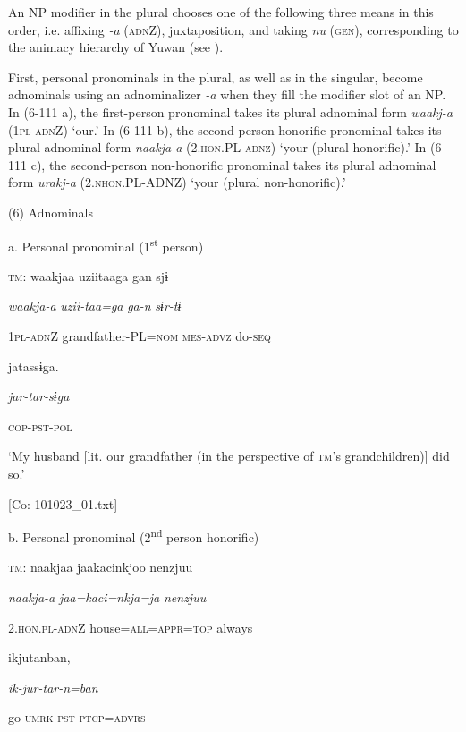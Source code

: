 An NP modifier in the plural chooses one of the following three means in this order, i.e. affixing \textit{{}-a} (\textsc{adn}Z), juxtaposition, and taking \textit{nu} (\textsc{gen}), corresponding to the animacy hierarchy of Yuwan (see ).

First, personal pronominals in the plural, as well as in the singular, become adnominals using an adnominalizer \textit{{}-a} when they fill the modifier slot of an NP. In (6-111 a), the first-person pronominal takes its plural adnominal form \textit{waakj-a} (1\textsc{pl}-\textsc{adn}Z) ‘our.’ In (6-111 b), the second-person honorific pronominal takes its plural adnominal form \textit{naakja-a} (2.\textsc{hon}.PL-\textsc{adnz}) ‘your (plural honorific).’ In (6-111 c), the second-person non-honorific pronominal takes its plural adnominal form \textit{urakj-a} (2.\textsc{nhon}.PL-ADNZ) ‘your (plural non-honorific).’

(6)  Adnominals

  a.  Personal pronominal (1\textsuperscript{st} person)

    \textsc{tm}:  waakjaa  uziitaaga  gan  sjɨ

      \textit{waakja-a}  \textit{uzii-taa=ga}  \textit{ga-n}  \textit{sɨr-tɨ}

      1\textsc{pl}-\textsc{adn}Z  grandfather-PL=\textsc{nom}  \textsc{mes}-\textsc{advz}  do-\textsc{seq}

      jatassɨga.

      \textit{jar-tar-sɨga}

      \textsc{cop}-\textsc{pst}-\textsc{pol}

      ‘My husband [lit. our grandfather (in the perspective of \textsc{tm}’s grandchildren)] did so.’

      [Co: 101023\_01.txt]

  b.  Personal pronominal (2\textsuperscript{nd} person honorific)

    \textsc{tm}:  naakjaa  jaakacinkjoo  {\textbar}nenzjuu{\textbar}

      \textit{naakja-a}  \textit{jaa=kaci=nkja=ja}  \textit{nenzjuu}

      2.\textsc{hon}.\textsc{pl}-\textsc{adn}Z  house=\textsc{all}=\textsc{appr}=\textsc{top}  always

      ikjutanban,

      \textit{ik-jur-tar-n=ban}

      go-\textsc{umrk}-\textsc{pst}-\textsc{ptcp}=\textsc{advrs}

